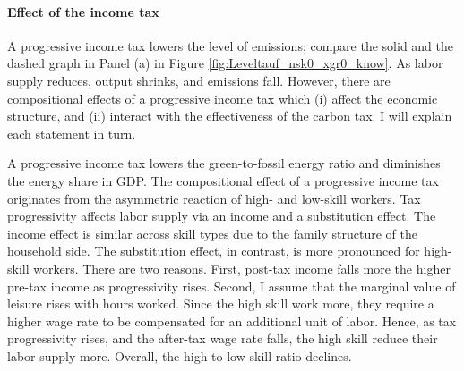\paragraph{Effect of the income tax}

A progressive income tax lowers the level of emissions; compare the solid and the dashed graph in Panel (a) in Figure \ref{fig:Leveltauf_nsk0_xgr0_know}. As labor supply reduces, output shrinks, and emissions fall. 
However, there are compositional effects of a progressive income tax which (i) affect the economic structure, and (ii) interact with the effectiveness of the carbon tax. I will explain each statement in turn. 

A progressive income tax lowers the green-to-fossil energy ratio and diminishes the energy share in GDP. %
The compositional effect of a progressive income tax originates from the asymmetric reaction of high- and low-skill workers. 
Tax progressivity affects labor supply via an income and a substitution effect. 
The income effect is similar across skill types due to the family structure of the household side.
The substitution effect, in contrast, is more pronounced for high-skill workers.
There are two reasons. First, post-tax income falls more the higher pre-tax income as progressivity rises. 
Second,  I assume that the marginal value of leisure rises with hours worked. Since the high skill work more, they require a higher wage rate to be compensated for an additional unit of labor. Hence, as tax progressivity rises, and the after-tax wage rate falls, the high skill reduce their labor supply more.  %
Overall, the high-to-low skill ratio declines. 


